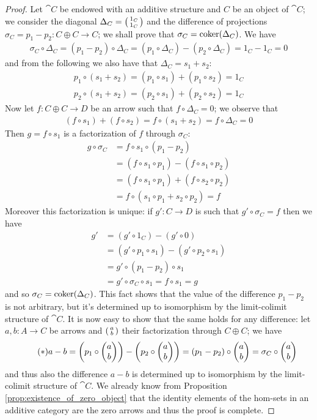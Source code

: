 \begin{proof}
  Let \(\cat{C}\) be endowed with an additive structure and \(C\) be an object of \(\cat{C}\); we consider the diagonal \(\Delta_C=\left(\begin{smallmatrix}1_C\\ 1_C\end{smallmatrix}\right)\) and the difference of projections \(\sigma_C= p_1-p_2:C\oplus C\to C\); we shall prove that \(\sigma_C = \operatorname{coker}(\Delta_C)\). We have
  \begin{gather*}
    \sigma_C\circ\Delta_C = (p_1-p_2)\circ\Delta_C = (p_1\circ\Delta_C) - (p_2\circ\Delta_C) = 1_C - 1_C = 0
  \end{gather*}
  and from the following we also have that \(\Delta_C = s_1+s_2\):
  \begin{align*}
    p_1\circ(s_1+s_2) = (p_1\circ s_1) + (p_1\circ s_2) = 1_C\\
    p_2\circ(s_1+s_2) = (p_2\circ s_1) + (p_2\circ s_2) = 1_C
  \end{align*}
  Now let \(f:C\oplus C\to D\) be an arrow such that \(f\circ\Delta_C= 0\); we observe that
  \begin{gather*}
    (f\circ s_1) + (f\circ s_2) = f\circ(s_1+s_2) = f\circ\Delta_C = 0
  \end{gather*}
  Then \(g=f\circ s_1\) is a factorization of \(f\) through \(\sigma_C\):
  \begin{align*}
    g\circ\sigma_C &= f\circ s_1 \circ (p_1 - p_2)\\
                   &= (f\circ s_1\circ p_1) - (f\circ s_1\circ p_2)\\
                   &= (f\circ s_1\circ p_1) + (f\circ s_2\circ p_2)\\
                   &= f\circ(s_1\circ p_1 + s_2\circ p_2) = f
  \end{align*}
  Moreover this factorization is unique: if \(g'\colon C\to D\) is such that \(g'\circ\sigma_C = f\) then we have
  \begin{align*}
    g' &= (g'\circ 1_C) - (g'\circ 0)\\
       &= (g'\circ p_1\circ s_1) - (g'\circ p_2\circ s_1)\\
       &= g'\circ (p_1-p_2)\circ s_1\\
       &= g'\circ\sigma_C\circ s_1 =  f\circ s_1 = g
  \end{align*}
  and so \(\sigma_C=\operatorname{coker}(\Delta_C)\). This fact shows that the value of the difference \(p_1-p_2\) is not arbitrary, but it's determined up to isomorphism by the limit-colimit structure of \(\cat{C}\). It is now easy to show that the same holds for any difference: let \(a,b:A\to C\) be arrows and \(\left(\begin{smallmatrix}a\\ b\end{smallmatrix}\right)\) their factorization through \(C\oplus C\); we have
  \begin{align*}
    \tag{\(*\)}
    a-b = \left(p_1\circ\begin{pmatrix}a\\ b\end{pmatrix}\right) - \left(p_2\circ\begin{pmatrix}a\\ b\end{pmatrix}\right) = (p_1 - p_2)\circ\begin{pmatrix}a\\ b\end{pmatrix} = \sigma_C\circ\begin{pmatrix}a\\ b\end{pmatrix}
  \end{align*}
  and thus also the difference \(a-b\) is determined up to isomorphism by the limit-colimit structure of \(\cat{C}\). We already know from Proposition \ref{prop:existence_of_zero_object} that the identity elements of the hom-sets in an additive category are the zero arrows  and thus the proof is complete.
\end{proof}

